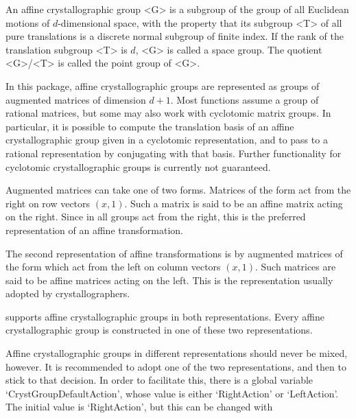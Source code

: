 

An affine crystallographic group <G> is a subgroup of the group of all
Euclidean motions of $d$-dimensional space, with the property that its
subgroup <T> of all pure translations is a discrete normal subgroup of
finite index. If the rank of the translation subgroup <T> is $d$, <G>
is called a space group. The quotient <G>/<T> is called the point group
of <G>.

In this package, affine crystallographic groups are represented as
groups of augmented matrices of dimension $d+1$. Most functions assume
a group of rational matrices, but some may also work with cyclotomic
matrix groups. In particular, it is possible to compute the translation
basis of an affine crystallographic group given in a cyclotomic
representation, and to pass to a rational representation by conjugating 
with that basis. Further functionality for cyclotomic crystallographic 
groups is currently not guaranteed.

Augmented matrices can take one of two forms. Matrices of the form
\begintt
                     [ M 0 ]
                     [ t 1 ]
\endtt
act from the right on row vectors $(x,1)$. Such a matrix is said to
be an affine matrix acting on the right. Since in {\GAP} all groups
act from the right, this is the preferred representation of an affine
transformation. 

The second representation of affine transformations is by augmented
matrices of the form 
\begintt
                     [ M t ]
                     [ 0 1 ]
\endtt
which act from the left on column vectors $(x,1)$. Such matrices are
said to be affine matrices acting on the left. This is the
representation usually adopted by crystallographers. 

{\Cryst} supports affine crystallographic groups in both
representations. Every affine crystallographic group is 
constructed in one of these two representations. 

Affine crystallographic groups in different representations should
never be mixed, however. It is recommended to adopt one of the two
representations, and then to stick to that decision. In order to
facilitate this, there is a global variable `CrystGroupDefaultAction',
whose value is either `RightAction' or `LeftAction'. The initial value
is `RightAction', but this can be changed with

